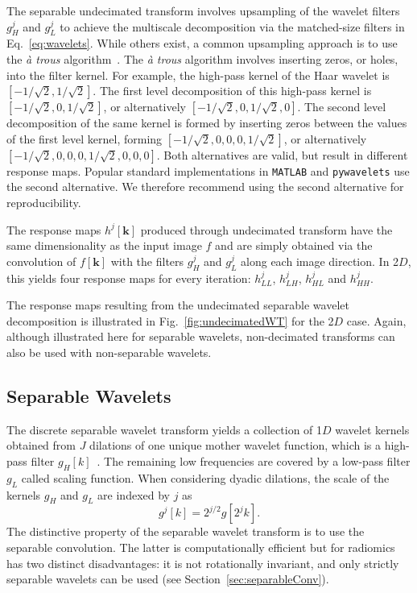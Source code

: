 \documentclass[fleqn,a4paper,oneside,openany]{book}
\begin{document}
The separable undecimated transform involves upsampling of the wavelet filters $g_H^j$ and $g_L^j$ to achieve the multiscale decomposition via the matched-size filters in Eq.~\eqref{eq:wavelets}.
While others exist, a common upsampling approach is to use the \emph{\`{a} trous} algorithm~\cite{Dut1989}.
%
The \emph{\`{a} trous} algorithm involves inserting zeros, or holes, into the filter kernel. For example, the high-pass kernel of the Haar wavelet is \(\left[ -1 / \sqrt{2}, 1 / \sqrt{2}\right]\). The first level decomposition of this high-pass kernel is \(\left[ -1 / \sqrt{2}, 0, 1 / \sqrt{2}\right]\), or alternatively \(\left[ -1 / \sqrt{2}, 0, 1 / \sqrt{2}, 0\right]\). The second level decomposition of the same kernel is formed by inserting zeros between the values of the first level kernel, forming \(\left[ -1 / \sqrt{2}, 0, 0, 0, 1 / \sqrt{2}\right]\), or alternatively \(\left[ -1 / \sqrt{2}, 0, 0, 0, 1 / \sqrt{2}, 0, 0, 0\right]\). Both alternatives are valid, but result in different response maps. Popular standard implementations in \texttt{MATLAB} and \texttt{pywavelets} use the second alternative. We therefore recommend using the second alternative for reproducibility.

The response maps $h^j[\boldsymbol{k}]$ produced through undecimated transform have the same dimensionality as the input image $f$ and are simply obtained via the convolution of $f[\boldsymbol{k}]$ with the filters $g_H^j$ and $g_L^j$ along each image direction.
In 2$D$, this yields four response maps for every iteration: $h_{LL}^j$, $h_{LH}^j$, $h_{HL}^j$ and $h_{HH}^j$.

The response maps resulting from the undecimated separable wavelet decomposition is illustrated in Fig.~\ref{fig:undecimatedWT} for the 2$D$ case.
Again, although illustrated here for separable wavelets, non-decimated transforms can also be used with non-separable wavelets.
%
\subsection{Separable Wavelets}\label{sec:separableWavelets}
%
The discrete separable wavelet transform yields a collection of 1$D$ wavelet kernels obtained from $J$ dilations of one unique mother wavelet function, which is a high-pass filter $g_H[k]$~\cite{Dau1992}.
The remaining low frequencies are covered by a low-pass filter $g_L$ called scaling function.
When considering dyadic dilations, the scale of the kernels $g_H$ and $g_L$ are indexed by $j$ as
%
\begin{equation}\label{eq:wavelets}
g^j[k] = 2^{j/2}g[2^j k].
\end{equation}
%
The distinctive property of the separable wavelet transform is to use the separable convolution. 
The latter is computationally efficient but for radiomics has two distinct disadvantages: it is not rotationally invariant, and only strictly separable wavelets can be used (see Section~\ref{sec:separableConv}). 
\end{document}

